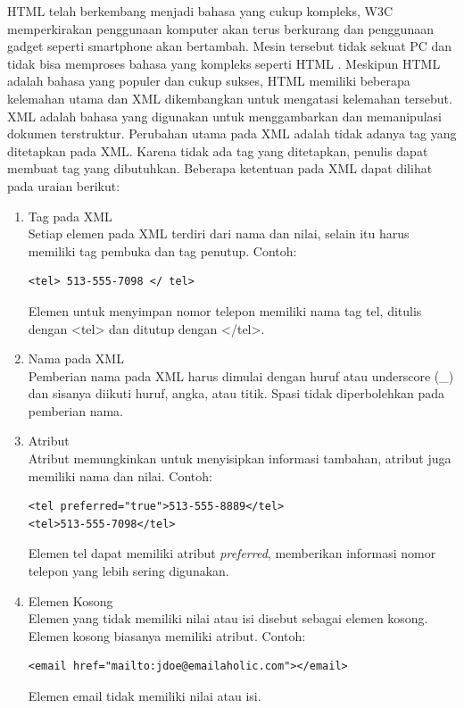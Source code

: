 HTML telah berkembang menjadi bahasa yang cukup kompleks, W3C memperkirakan
penggunaan komputer akan terus berkurang dan penggunaan gadget seperti smartphone 
akan bertambah. Mesin tersebut tidak sekuat PC dan tidak bisa memproses bahasa yang 
kompleks seperti HTML . Meskipun HTML adalah bahasa yang populer dan cukup sukses, HTML 
memiliki beberapa kelemahan utama dan XML dikembangkan untuk mengatasi kelemahan tersebut. 
XML adalah bahasa yang digunakan untuk menggambarkan dan memanipulasi dokumen
terstruktur. Perubahan utama pada XML adalah tidak adanya tag yang ditetapkan pada XML. 
Karena tidak ada tag yang ditetapkan, penulis dapat membuat tag yang dibutuhkan. 
Beberapa ketentuan pada XML dapat dilihat pada uraian berikut:
\begin{enumerate}
\item Tag pada XML \\
Setiap elemen pada XML terdiri dari nama dan nilai, selain itu harus memiliki
tag pembuka dan tag penutup. Contoh: 
\begin{verbatim}
<tel> 513-555-7098 </ tel>
\end{verbatim}
Elemen untuk menyimpan nomor telepon memiliki nama tag tel, ditulis dengan <tel>
dan ditutup dengan </tel>.

\item Nama pada XML \\
Pemberian nama pada XML harus dimulai dengan huruf atau underscore (\_) dan
sisanya diikuti huruf, angka, atau titik. Spasi tidak diperbolehkan pada
pemberian nama.

\item Atribut \\
Atribut memungkinkan untuk menyisipkan informasi tambahan, atribut juga memiliki
nama dan nilai. Contoh:
\begin{verbatim}
<tel preferred="true">513-555-8889</tel>
<tel>513-555-7098</tel>
\end{verbatim}
Elemen tel dapat memiliki atribut \textit{preferred}, memberikan informasi nomor
telepon yang lebih sering digunakan.

\item Elemen Kosong \\
Elemen yang tidak memiliki nilai atau isi disebut sebagai elemen kosong. Elemen
kosong biasanya memiliki atribut. Contoh:
\begin{verbatim}
<email href="mailto:jdoe@emailaholic.com"></email>
\end{verbatim}
Elemen email tidak memiliki nilai atau isi.


\end{enumerate}
